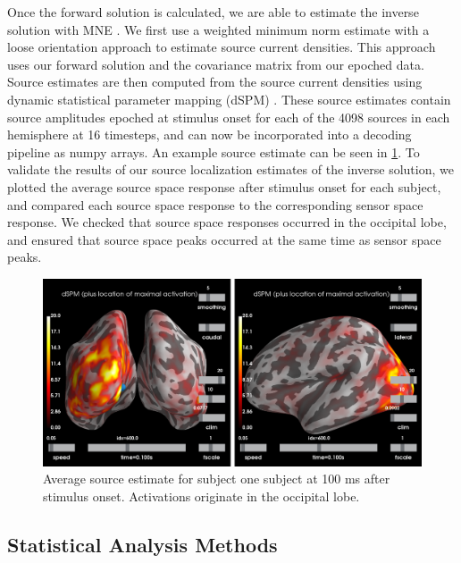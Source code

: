 \documentclass[../main.tex]{subfiles}
\begin{document}
Once the forward solution is calculated, we are able to estimate the inverse solution with MNE \cite{mne}. We first use a weighted minimum norm estimate \citep{fuchs_1999, lin_2006} with a loose orientation approach \citep{lin_2005} to estimate source current densities. This approach uses our forward solution and the covariance matrix from our epoched data. Source estimates are then computed from the source current densities using dynamic statistical parameter mapping (dSPM) \citep{DALE200055}. These source estimates contain source amplitudes epoched at stimulus onset for each of the 4098 sources in each hemisphere at 16 timesteps, and can now be incorporated into a decoding pipeline as numpy arrays. An example source estimate can be seen in \ref{source_ka}. To validate the results of our source localization estimates of the inverse solution, we plotted the average source space response after stimulus onset for each subject, and compared each source space response to the corresponding sensor space response. We checked that source space responses occurred in the occipital lobe, and ensured that source space peaks occurred at the same time as sensor space peaks.

\begin{figure}[h]
    \centering
    \includegraphics[scale=0.4]{figures/methods/source_loc_KA.png}
    \caption{Average source estimate for subject one subject at 100 ms after stimulus onset. Activations originate in the occipital lobe.}
    \label{source_ka}
\end{figure}

\subsection{Statistical Analysis Methods}
\end{document}
